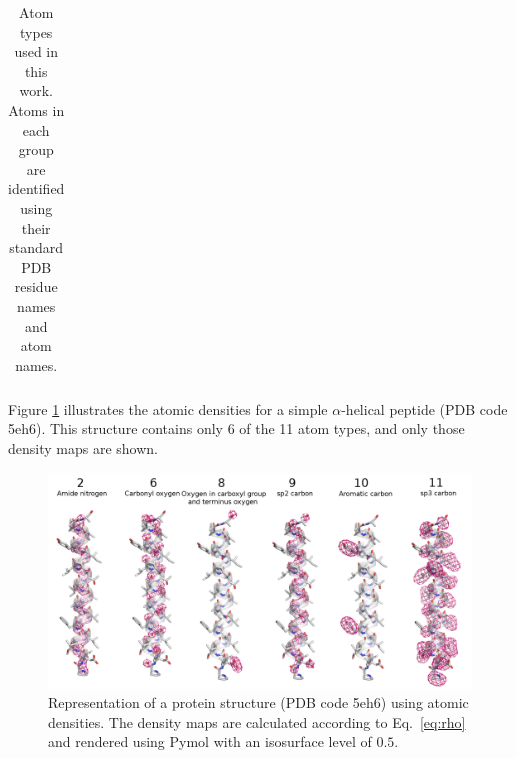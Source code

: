 \begin{table}[H]
\begin{center}
\begin{tabular}{ c | l | l }
\end{tabular}
    
    \caption {Atom types used in this work. Atoms in each group are
    identified using their standard PDB residue names and atom names.}

    \label{Tbl:atomTypes}
\end{center}
\end{table}

Figure \ref{Fig:atomic_densities} illustrates the atomic densities for
a simple $\alpha$-helical peptide (PDB code 5eh6). This structure
contains only 6 of the 11 atom types, and only those density maps are
shown.

\begin{figure}[H]
    \centering
    \includegraphics[width=\linewidth]{Fig/atomic_densities_V3.png}

    \caption{Representation of a protein structure (PDB code 5eh6)
    using atomic densities. The density maps are calculated according
    to Eq.~\ref{eq:rho} and rendered using Pymol \cite{} with an
    isosurface level of $0.5$.}

    \label{Fig:atomic_densities}
\end{figure}
